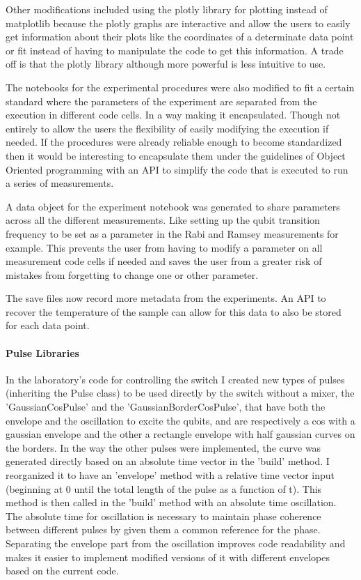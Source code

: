 \documentclass[11pt,onecolumm,a4paper]{article}
\begin{document}
Other modifications included using the plotly library for plotting instead of matplotlib because the plotly graphs are interactive and allow the users to easily get information about their plots like the coordinates of a determinate data point or fit instead of having to manipulate the code to get this information. A trade off is that the plotly library although more powerful is less intuitive to use.

The notebooks for the experimental procedures were also modified to fit a certain standard where the parameters of the experiment are separated from the execution in different code cells. In a way making it encapsulated. Though not entirely to allow the users the flexibility of easily modifying the execution if needed. If the procedures were already reliable enough to become standardized then it would be interesting to encapsulate them under the guidelines of Object Oriented programming with an API to simplify the code that is executed to run a series of measurements.

A data object for the experiment notebook was generated to share parameters across all the different measurements. Like setting up the qubit transition frequency to be set as a parameter in the Rabi and Ramsey measurements for example. This prevents the user from having to modify a parameter on all measurement code cells if needed and saves the user from a greater risk of mistakes from forgetting to change one or other parameter.

The save files now record more metadata from the experiments. An API to recover the temperature of the sample can allow for this data to also be stored for each data point.

\paragraph{Pulse Libraries} In the laboratory's code for controlling the switch I created new types of pulses (inheriting the Pulse class) to be used directly by the switch without a mixer, the 'GaussianCosPulse' and the 'GaussianBorderCosPulse', that have both the envelope and the oscillation to excite the qubits, and are respectively a cos with a gaussian envelope and the other a rectangle envelope with half gaussian curves on the borders. In the way the other pulses were implemented, the curve was generated directly based on an absolute time vector in the 'build' method. I reorganized it to have an 'envelope' method with a relative time vector input (beginning at 0 until the total length of the pulse as a function of t). This method is then called in the 'build' method with an absolute time oscillation. The absolute time for oscillation is necessary to maintain phase coherence between different pulses by given them a common reference for the phase. Separating the envelope part from the oscillation improves code readability and makes it easier to implement modified versions of it with different envelopes based on the current code.
\end{document}
